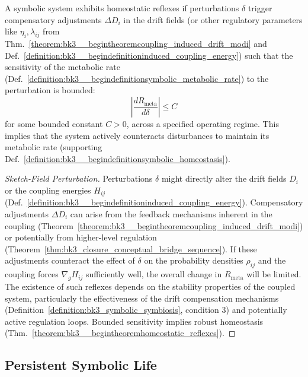 \begin{theorem} \label{theorem:bk3__begintheoremhomeostatic_reflexes}
A symbolic system exhibits homeostatic reflexes if perturbations $\delta$ trigger compensatory adjustments $\Delta D_i$ in the drift fields (or other regulatory parameters like $\eta_i, \lambda_{ij}$ from Thm.~\ref{theorem:bk3__begintheoremcoupling_induced_drift_modi} and Def.~\ref{definition:bk3__begindefinitioninduced_coupling_energy}) such that the sensitivity of the metabolic rate (Def.~\ref{definition:bk3__begindefinitionsymbolic_metabolic_rate}) to the perturbation is bounded:
\[
\left| \frac{d R_{\text{meta}}}{d \delta} \right| \leq C
\]
for some bounded constant $C > 0$, across a specified operating regime. This implies that the system actively counteracts disturbances to maintain its metabolic rate (supporting Def.~\ref{definition:bk3__begindefinitionsymbolic_homeostasis}).
\end{theorem}

\begin{proof}[Sketch-Field Perturbation]
\label{proof:bk3_sketch_field_perturbation}
Perturbations $\delta$ might directly alter the drift fields $D_i$ or the coupling energies $H_{ij}$ (Def.~\ref{definition:bk3__begindefinitioninduced_coupling_energy}). Compensatory adjustments $\Delta D_i$ can arise from the feedback mechanisms inherent in the coupling (Theorem~\ref{theorem:bk3__begintheoremcoupling_induced_drift_modi}) or potentially from higher-level regulation (Theorem~\ref{thm:bk3_closure_conceptual_bridge_sequence}). If these adjustments counteract the effect of $\delta$ on the probability densities $\rho_{ij}$ and the coupling forces $\nabla_g H_{ij}$ sufficiently well, the overall change in $R_{\text{meta}}$ will be limited. The existence of such reflexes depends on the stability properties of the coupled system, particularly the effectiveness of the drift compensation mechanisms (Definition~\ref{definition:bk3_symbolic_symbiosis}, condition 3) and potentially active regulation loops. Bounded sensitivity implies robust homeostasis (Thm.~\ref{theorem:bk3__begintheoremhomeostatic_reflexes}).
\end{proof}

\subsection{Persistent Symbolic Life}

